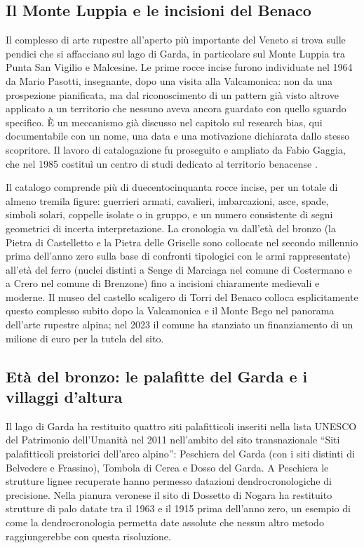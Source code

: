 \subsection{Il Monte Luppia e le incisioni del Benaco}

Il complesso di arte rupestre all'aperto più importante del Veneto si trova sulle pendici che si affacciano sul lago di Garda, in particolare sul Monte Luppia tra Punta San Vigilio e Malcesine. Le prime rocce incise furono individuate nel 1964 da Mario Pasotti, insegnante, dopo una visita alla Valcamonica: non da una prospezione pianificata, ma dal riconoscimento di un pattern già visto altrove applicato a un territorio che nessuno aveva ancora guardato con quello sguardo specifico. È un meccanismo già discusso nel capitolo sul research bias, qui documentabile con un nome, una data e una motivazione dichiarata dallo stesso scopritore. Il lavoro di catalogazione fu proseguito e ampliato da Fabio Gaggia, che nel 1985 costituì un centro di studi dedicato al territorio benacense \citep{gaggia1982, gaggia2002}.

Il catalogo comprende più di duecentocinquanta rocce incise, per un totale di almeno tremila figure: guerrieri armati, cavalieri, imbarcazioni, asce, spade, simboli solari, coppelle isolate o in gruppo, e un numero consistente di segni geometrici di incerta interpretazione. La cronologia va dall'età del bronzo (la Pietra di Castelletto e la Pietra delle Griselle sono collocate nel secondo millennio prima dell'anno zero sulla base di confronti tipologici con le armi rappresentate) all'età del ferro (nuclei distinti a Senge di Marciaga nel comune di Costermano e a Crero nel comune di Brenzone) fino a incisioni chiaramente medievali e moderne. Il museo del castello scaligero di Torri del Benaco colloca esplicitamente questo complesso subito dopo la Valcamonica e il Monte Bego nel panorama dell'arte rupestre alpina; nel 2023 il comune ha stanziato un finanziamento di un milione di euro per la tutela del sito.

\subsection{Età del bronzo: le palafitte del Garda e i villaggi d'altura}

Il lago di Garda ha restituito quattro siti palafitticoli inseriti nella lista UNESCO del Patrimonio dell'Umanità nel 2011 nell'ambito del sito transnazionale ``Siti palafitticoli preistorici dell'arco alpino'': Peschiera del Garda (con i siti distinti di Belvedere e Frassino), Tombola di Cerea e Dosso del Garda. A Peschiera le strutture lignee recuperate hanno permesso datazioni dendrocronologiche di precisione. Nella pianura veronese il sito di Dossetto di Nogara ha restituito strutture di palo datate tra il 1963 e il 1915 prima dell'anno zero, un esempio di come la dendrocronologia permetta date assolute che nessun altro metodo raggiungerebbe con questa risoluzione.

